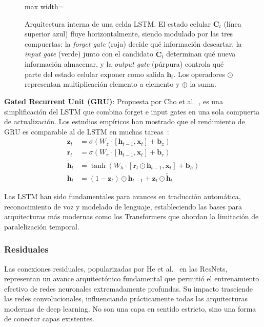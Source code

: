\begin{figure}[htbp]
\begin{adjustbox}{max width=\textwidth}
\begin{tikzpicture}
\end{tikzpicture}
\end{adjustbox}
\caption[Arquitectura de celda LSTM]{Arquitectura interna de una celda LSTM. El estado celular $\mathbf{C}_t$ (línea superior azul) fluye horizontalmente, siendo modulado por las tres compuertas: la \textit{forget gate} (roja) decide qué información descartar, la \textit{input gate} (verde) junto con el candidato $\tilde{\mathbf{C}}_t$ determinan qué nueva información almacenar, y la \textit{output gate} (púrpura) controla qué parte del estado celular exponer como salida $\mathbf{h}_t$. Los operadores $\odot$ representan multiplicación elemento a elemento y $\oplus$ la suma.}
\label{fig:lstm_arquitectura}
\end{figure}

\textbf{Gated Recurrent Unit (GRU)}: Propuesta por Cho et al.~\citep{cho2014learning}, es una simplificación del \gls{LSTM} que combina forget e input gates en una sola compuerta de actualización. Los estudios empíricos han mostrado que el rendimiento de \gls{GRU} es comparable al de \gls{LSTM} en muchas tareas~\citep{chung2014empirical}:
\begin{align}
\mathbf{z}_t &= \sigma(W_z \cdot [\mathbf{h}_{t-1}, \mathbf{x}_t] + \mathbf{b}_z) \\
\mathbf{r}_t &= \sigma(W_r \cdot [\mathbf{h}_{t-1}, \mathbf{x}_t] + \mathbf{b}_r) \\
\tilde{\mathbf{h}}_t &= \tanh(W_h \cdot [\mathbf{r}_t \odot \mathbf{h}_{t-1}, \mathbf{x}_t] + \mathbf{b}_h) \\
\mathbf{h}_t &= (1 - \mathbf{z}_t) \odot \mathbf{h}_{t-1} + \mathbf{z}_t \odot \tilde{\mathbf{h}}_t
\end{align}

Las \gls{LSTM} han sido fundamentales para avances en traducción automática, reconocimiento de voz y modelado de lenguaje, estableciendo las bases para arquitecturas más modernas como los \glspl{Transformer} que abordan la limitación de paralelización temporal.

\subsubsection{Residuales}

Las conexiones residuales, popularizadas por He et al.~\citep{he2016deep} en las ResNets, representan un avance arquitectónico fundamental que permitió el entrenamiento efectivo de redes neuronales extremadamente profundas. Su impacto trasciende las redes convolucionales, influenciando prácticamente todas las arquitecturas modernas de deep learning. No son una capa en sentido estricto, sino una forma de conectar capas existentes.

